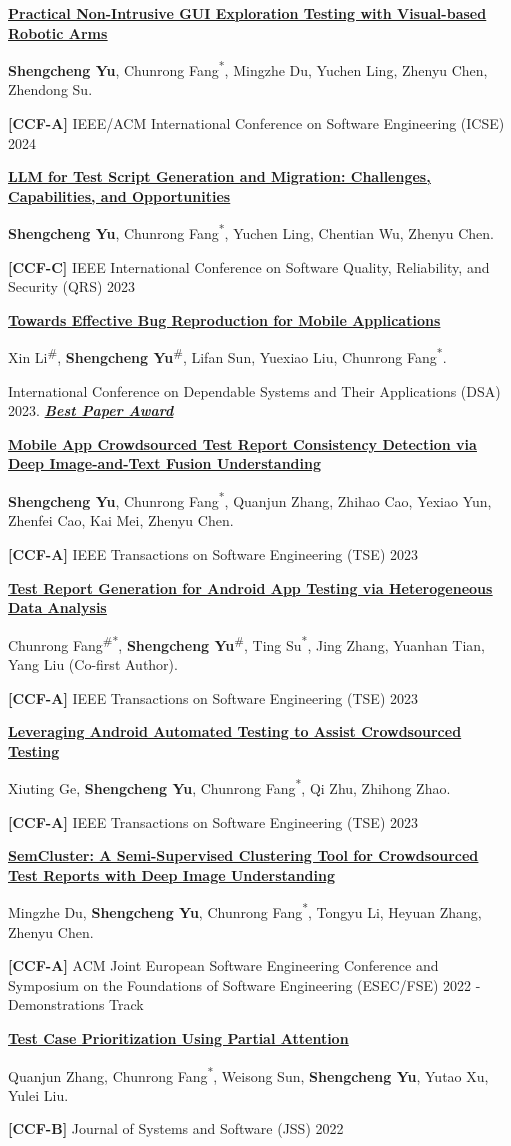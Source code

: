 \documentclass[12pt,a4paper]{article}
\newcommand{\me}{\textbf{Shengcheng Yu}}
\newcommand{\cofirst}{\textsuperscript{\#}}
\newcommand{\corr}{\textsuperscript{*}}
\newcommand{\ccf}[1]{\textbf{[#1]}}
\newcommand{\awardtag}[1]{\textbf{\textit{\uline{#1}}}}
\newcommand{\publication}[5]{%
  \begin{samepage}%
  \href{#5}{\textbf{\uline{#1}}}#2\par\nopagebreak[4]
  #3.\par\nopagebreak[4]
  #4\par
  \end{samepage}%
  \vspace{4.8pt}%
}
\begin{document}
\publication
{Practical Non-Intrusive GUI Exploration Testing with Visual-based Robotic Arms}
{}
{\me, Chunrong Fang\corr, Mingzhe Du, Yuchen Ling, Zhenyu Chen, Zhendong Su}
{\ccf{CCF-A} IEEE/ACM International Conference on Software Engineering (ICSE) 2024}
{https://doi.org/10.1145/3597503.3639161}

\publication
{LLM for Test Script Generation and Migration: Challenges, Capabilities, and Opportunities}
{}
{\me, Chunrong Fang\corr, Yuchen Ling, Chentian Wu, Zhenyu Chen}
{\ccf{CCF-C} IEEE International Conference on Software Quality, Reliability, and Security (QRS) 2023}
{https://doi.org/10.1109/QRS60937.2023.00029}

\publication
{Towards Effective Bug Reproduction for Mobile Applications}
{}
{Xin Li\cofirst, \me\cofirst, Lifan Sun, Yuexiao Liu, Chunrong Fang\corr}
{International Conference on Dependable Systems and Their Applications (DSA) 2023. \awardtag{Best Paper Award}}
{https://doi.org/10.1109/DSA59317.2023.00024}

\publication
{Mobile App Crowdsourced Test Report Consistency Detection via Deep Image-and-Text Fusion Understanding}
{}
{\me, Chunrong Fang\corr, Quanjun Zhang, Zhihao Cao, Yexiao Yun, Zhenfei Cao, Kai Mei, Zhenyu Chen}
{\ccf{CCF-A} IEEE Transactions on Software Engineering (TSE) 2023}
{https://doi.org/10.1109/TSE.2023.3285787}

\publication
{Test Report Generation for Android App Testing via Heterogeneous Data Analysis}
{}
{Chunrong Fang\cofirst\corr, \me\cofirst, Ting Su\corr, Jing Zhang, Yuanhan Tian, Yang Liu (Co-first Author)}
{\ccf{CCF-A} IEEE Transactions on Software Engineering (TSE) 2023}
{https://doi.org/10.1109/TSE.2023.3237247}

\publication
{Leveraging Android Automated Testing to Assist Crowdsourced Testing}
{}
{Xiuting Ge, \me, Chunrong Fang\corr, Qi Zhu, Zhihong Zhao}
{\ccf{CCF-A} IEEE Transactions on Software Engineering (TSE) 2023}
{https://doi.org/10.1109/TSE.2022.3216879}

\publication
{SemCluster: A Semi-Supervised Clustering Tool for Crowdsourced Test Reports with Deep Image Understanding}
{}
{Mingzhe Du, \me, Chunrong Fang\corr, Tongyu Li, Heyuan Zhang, Zhenyu Chen}
{\ccf{CCF-A} ACM Joint European Software Engineering Conference and Symposium on the Foundations of Software Engineering (ESEC/FSE) 2022 - Demonstrations Track}
{https://doi.org/10.1145/3540250.3558933}

\publication
{Test Case Prioritization Using Partial Attention}
{}
{Quanjun Zhang, Chunrong Fang\corr, Weisong Sun, \me, Yutao Xu, Yulei Liu}
{\ccf{CCF-B} Journal of Systems and Software (JSS) 2022}
{https://doi.org/10.1016/j.jss.2022.111419}
\end{document}

